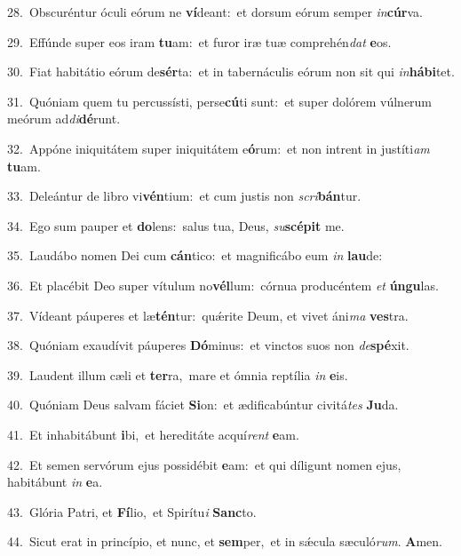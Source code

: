 {\numbfont\textcolor{\numbcolor}{28.}}~Obscuréntur óculi eórum ne \textbf{ví}\-deant:~\star et dorsum eórum semper \textit{in}\-\textbf{cúr}va.\par
{\numbfont\textcolor{\numbcolor}{29.}}~Effúnde super eos iram \textbf{tu}\-am:~\star et furor iræ tuæ comprehén\textit{dat} \textbf{e}\-os.\par
{\numbfont\textcolor{\numbcolor}{30.}}~Fiat habitátio eórum de\-\textbf{sér}\-ta:~\star et in tabernáculis eórum non sit qui \textit{in}\-\textbf{há}\textbf{bi}tet.\par
{\numbfont\textcolor{\numbcolor}{31.}}~Quóniam quem tu percussísti, perse\-\textbf{cú}\-ti sunt:~\star et super dolórem vúlnerum meórum ad\-\textit{di}\-\textbf{dé}runt.\par
{\numbfont\textcolor{\numbcolor}{32.}}~Appóne iniquitátem super iniquitátem e\-\textbf{ó}\-rum:~\star et non intrent in justíti\textit{am} \textbf{tu}\-am.\par
{\numbfont\textcolor{\numbcolor}{33.}}~Deleántur de libro vi\-\textbf{vén}\-tium:~\star et cum justis non \textit{scri}\-\textbf{bán}tur.\par
{\numbfont\textcolor{\numbcolor}{34.}}~Ego sum pauper et \textbf{do}\-lens:~\star salus tua, Deus, \textit{su}\-\textbf{scé}\textbf{pit} me.\par
{\numbfont\textcolor{\numbcolor}{35.}}~Laudábo nomen Dei cum \textbf{cán}\-tico:~\star et magnificábo eum \textit{in} \textbf{lau}\-de:\par
{\numbfont\textcolor{\numbcolor}{36.}}~Et placébit Deo super vítulum no\-\textbf{vél}\-lum:~\star córnua producéntem \textit{et} \textbf{ún}\-\textbf{gu}las.\par
{\numbfont\textcolor{\numbcolor}{37.}}~Vídeant páuperes et læ\-\textbf{tén}\-tur:~\star quǽrite Deum, et vivet áni\textit{ma} \textbf{ves}\-tra.\par
{\numbfont\textcolor{\numbcolor}{38.}}~Quóniam exaudívit páuperes \textbf{Dó}\-minus:~\star et vinctos suos non \textit{de}\-\textbf{spé}xit.\par
{\numbfont\textcolor{\numbcolor}{39.}}~Laudent illum cæli et \textbf{ter}\-ra,~\star mare et ómnia reptília \textit{in} \textbf{e}\-is.\par
{\numbfont\textcolor{\numbcolor}{40.}}~Quóniam Deus salvam fáciet \textbf{Si}\-on:~\star et ædificabúntur civitá\textit{tes} \textbf{Ju}\-da.\par
{\numbfont\textcolor{\numbcolor}{41.}}~Et inhabitábunt \textbf{i}\-bi,~\star et hereditáte acquí\textit{rent} \textbf{e}\-am.\par
{\numbfont\textcolor{\numbcolor}{42.}}~Et semen servórum ejus possidébit \textbf{e}\-am:~\star et qui díligunt nomen ejus, habitábunt \textit{in} \textbf{e}\-a.\par
{\numbfont\textcolor{\numbcolor}{43.}}~Glória Patri, et \textbf{Fí}\-lio,~\star et Spirítu\textit{i} \textbf{Sanc}\-to.\par
{\numbfont\textcolor{\numbcolor}{44.}}~Sicut erat in princípio, et nunc, et \textbf{sem}\-per,~\star et in sǽcula sæculó\-\textit{rum}\-. \textbf{A}\-men.\par
